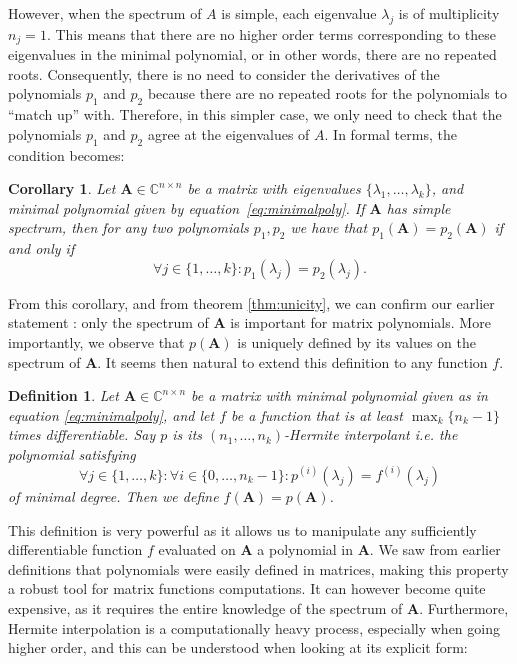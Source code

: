 \documentclass[11pt]{article}
\newtheorem{definition}{Definition}[section]
\newtheorem{corollary}{Corollary}[theorem]
\numberwithin{equation}{section}
\begin{document}
However, when the spectrum of $A$ is simple, each eigenvalue $\lambda_j$ is of multiplicity $n_j=1$. This means that there are no higher order terms corresponding to these eigenvalues in the minimal polynomial, or in other words, there are no repeated roots. Consequently, there is no need to consider the derivatives of the polynomials $p_1$ and $p_2$ because there are no repeated roots for the polynomials to ``match up'' with. Therefore, in this simpler case, we only need to check that the polynomials $p_1$ and $p_2$ agree at the eigenvalues of $A$. In formal terms, the condition becomes:
\begin{corollary}\label{cor:unicity}
Let $\mathbf{A}\in \mathbb{C}^{n\times n}$ be a matrix with eigenvalues $\{\lambda_1,\ldots,\lambda_k\}$, and minimal polynomial given by equation~\ref{eq:minimalpoly}. If $\mathbf{A}$ has simple spectrum, then for any two polynomials $p_1,p_2$ we have that $p_1(\mathbf{A})=p_2(\mathbf{A})$ if and only if
\begin{equation*}
    \forall j\in\{1,\ldots,k\}: p_1(\lambda_j)=p_2(\lambda_j).
\end{equation*}
\end{corollary}
From this corollary, and from theorem \ref{thm:unicity}, we can confirm our earlier statement : only the spectrum of $\mathbf{A}$ is important for matrix polynomials. More importantly, we observe that $p(\mathbf{A})$ is uniquely defined by its values on the spectrum of $\mathbf{A}$. It seems then natural to extend this definition to any function $f$.
\begin{definition}\label{def:Hermite}
    Let $\mathbf{A}\in\mathbb{C}^{n\times n}$ be a matrix with minimal polynomial given as in equation \ref{eq:minimalpoly}, and let $f$ be a function that is at least $\max_k\{n_k-1\}$ times differentiable. Say $p$ is its $(n_1,\ldots,n_k)$-\emph{Hermite interpolant} i.e. the polynomial satisfying
    $$\forall j\in\{1,\ldots,k\}:\forall i\in\{0,\ldots,n_k-1\}: p^{(i)}(\lambda_j)=f^{(i)}(\lambda_j)$$
    of minimal degree. Then we define $f(\mathbf{A})=p(\mathbf{A})$.
\end{definition}
This definition is very powerful as it allows us to manipulate any sufficiently differentiable function $f$ evaluated on $\mathbf{A}$ a polynomial in $\mathbf{A}$. We saw from earlier definitions that polynomials were easily defined in matrices, making this property a robust tool for matrix functions computations. It can however become quite expensive, as it requires the entire knowledge of the spectrum of $\mathbf{A}$. Furthermore, Hermite interpolation is a computationally heavy process, especially when going higher order, and this can be understood when looking at its explicit form:
\end{document}
